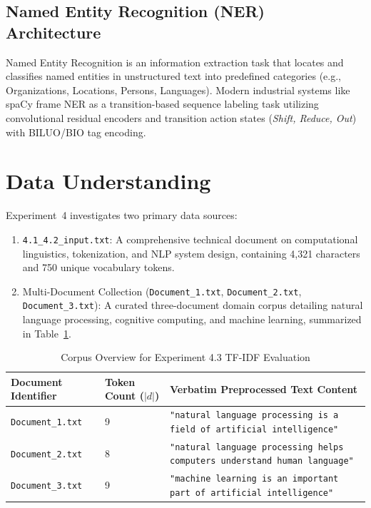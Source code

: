 \documentclass[12pt,a4paper]{report}
\begin{document}
\subsection{Named Entity Recognition (NER) Architecture}
Named Entity Recognition is an information extraction task that locates and classifies named entities in unstructured text into predefined categories (e.g., Organizations, Locations, Persons, Languages). Modern industrial systems like spaCy frame NER as a transition-based sequence labeling task utilizing convolutional residual encoders and transition action states (\textit{Shift, Reduce, Out}) with BILUO/BIO tag encoding.

\section{Data Understanding}
Experiment~4 investigates two primary data sources:
\begin{enumerate}
    \item \texttt{4.1\_4.2\_input.txt}: A comprehensive technical document on computational linguistics, tokenization, and NLP system design, containing 4,321 characters and 750 unique vocabulary tokens.
    \item Multi-Document Collection (\texttt{Document\_1.txt}, \texttt{Document\_2.txt}, \texttt{Document\_3.txt}): A curated three-document domain corpus detailing natural language processing, cognitive computing, and machine learning, summarized in Table~\ref{tab:exp4_docs_summary}.
\end{enumerate}

\begin{table}[H]
\centering
\small
\caption{Corpus Overview for Experiment 4.3 TF-IDF Evaluation}
\label{tab:exp4_docs_summary}
\begin{tabularx}{\textwidth}{lp{2cm}X}
\toprule
\textbf{Document Identifier} & \textbf{Token Count ($|d|$)} & \textbf{Verbatim Preprocessed Text Content} \\
\midrule
\texttt{Document\_1.txt} & 9 & \texttt{"natural language processing is a field of artificial intelligence"} \\
\texttt{Document\_2.txt} & 8 & \texttt{"natural language processing helps computers understand human language"} \\
\texttt{Document\_3.txt} & 9 & \texttt{"machine learning is an important part of artificial intelligence"} \\
\bottomrule
\end{tabularx}
\end{table}
\end{document}
